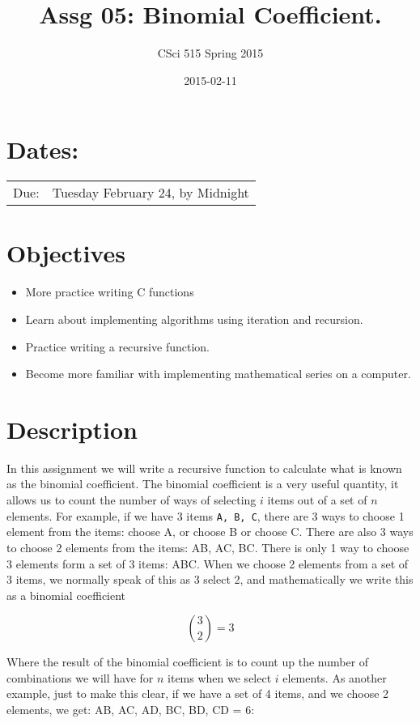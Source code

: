 \documentclass[11pt]{article}
\title{Assg 05: Binomial Coefficient.}
\author{CSci 515 Spring 2015}
\date{2015-02-11}
\begin{document}
\maketitle


\section*{Dates:}
\label{sec-1}


\begin{center}
\begin{tabular}{ll}
 Due:  &  Tuesday February 24, by Midnight  \\
\end{tabular}
\end{center}
\section*{Objectives}
\label{sec-2}

\begin{itemize}
\item More practice writing C functions
\item Learn about implementing algorithms using iteration and recursion.
\item Practice writing a recursive function.
\item Become more familiar with implementing mathematical series on a computer.
\end{itemize}
\section*{Description}
\label{sec-3}

In this assignment we will write a recursive function to calculate
what is known as the binomial coefficient.  The binomial coefficient
is a very useful quantity, it allows us to count the number of ways of
selecting $i$ items out of a set of $n$ elements.  For example, if we
have $3$ items \verb~A, B, C~, there are 3 ways to choose 1 element from
the items: choose A, or choose B or choose C.  There are also 3 ways
to choose 2 elements from the items: AB, AC, BC.  There is only 1 way
to choose 3 elements form a set of 3 items: ABC. When we choose
2 elements from a set of 3 items, we normally speak of this as
3 select 2, and mathematically we write this as a binomial coefficient

$$
{3 \choose 2} = 3
$$

Where the result of the binomial coefficient is to count up the number of
combinations we will have for $n$ items when we select $i$ elements.  As
another example, just to make this clear, if we have a set of 4 items, and
we choose 2 elements, we get: AB, AC, AD, BC, BD, CD = 6:
\end{document}
